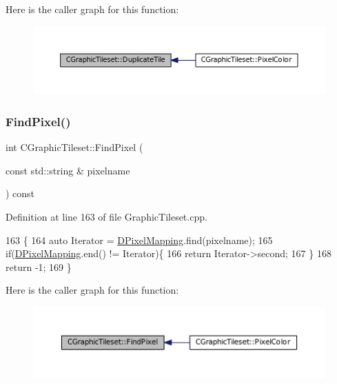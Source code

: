 Here is the caller graph for this function\+:\nopagebreak
\begin{figure}[H]
\begin{center}
\leavevmode
\includegraphics[width=350pt]{classCGraphicTileset_a78db70086b4cd1085fd3b5d0d0dc5fdd_icgraph}
\end{center}
\end{figure}
\hypertarget{classCGraphicTileset_a87047c22039dc6137b790b7609c627a8}{}\label{classCGraphicTileset_a87047c22039dc6137b790b7609c627a8} 
\subsubsection{\texorpdfstring{Find\+Pixel()}{FindPixel()}}
{\footnotesize\ttfamily int C\+Graphic\+Tileset\+::\+Find\+Pixel (\begin{DoxyParamCaption}\item[{const std\+::string \&}]{pixelname }\end{DoxyParamCaption}) const}



Definition at line 163 of file Graphic\+Tileset.\+cpp.


\begin{DoxyCode}
163                                                               \{
164     \textcolor{keyword}{auto} Iterator = \hyperlink{classCGraphicTileset_a650c021d8ea1724a4c9564600df0da05}{DPixelMapping}.find(pixelname);
165     \textcolor{keywordflow}{if}(\hyperlink{classCGraphicTileset_a650c021d8ea1724a4c9564600df0da05}{DPixelMapping}.end() != Iterator)\{
166         \textcolor{keywordflow}{return} Iterator->second;
167     \}
168     \textcolor{keywordflow}{return} -1;
169 \}
\end{DoxyCode}
Here is the caller graph for this function\+:\nopagebreak
\begin{figure}[H]
\begin{center}
\leavevmode
\includegraphics[width=350pt]{classCGraphicTileset_a87047c22039dc6137b790b7609c627a8_icgraph}
\end{center}
\end{figure}
\hypertarget{classCGraphicTileset_ab8f2c2b2f2095b17d53c3dc475d5685c}{}\label{classCGraphicTileset_ab8f2c2b2f2095b17d53c3dc475d5685c} 
